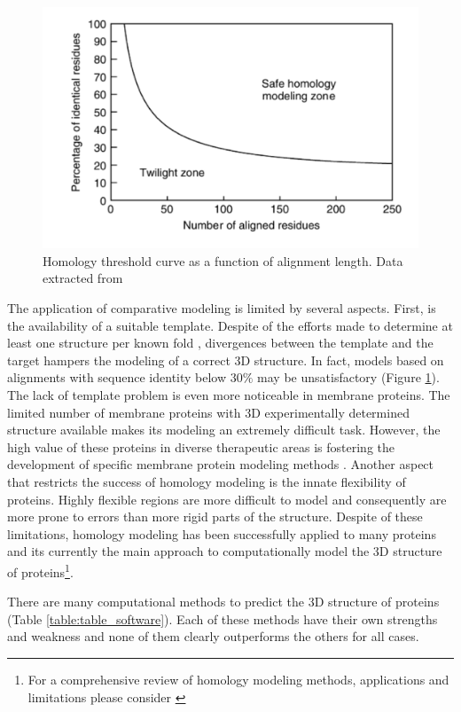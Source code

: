 \documentclass[11pt, b5paper,twoside]{tesi_upf}
\begin{document}
\begin{figure}[htbp]

  \centering
  	\includegraphics[scale=0.35]{../figures/homology_plot.pdf} %

	\caption[Homology threshold curve as a function of alignment length]{Homology threshold curve as a function of alignment length. Data extracted from \cite{Sander1991}}
	\label{fig:homology_modeling}
\end{figure}
\par The application of comparative modeling is limited by several aspects. First, is the availability of a suitable template. Despite of the efforts made to determine at least one structure per known fold \cite{Norvell2007}, divergences between the template and the target hampers the modeling of a correct 3D structure. In fact, models based on alignments with sequence identity below 30$\%$ may be unsatisfactory (Figure \ref{fig:homology_modeling}). The lack of template problem is even more noticeable in membrane proteins. The limited number of membrane proteins with 3D experimentally determined structure available makes its modeling an extremely difficult task. However, the high value of these proteins in diverse therapeutic areas \cite{Du2012, Kampen2011} is fostering the development of specific membrane protein modeling methods \cite{Leman2015}. Another aspect that restricts the success of homology modeling is the innate flexibility of proteins. Highly flexible regions are more difficult to model and consequently are more prone to errors than more rigid parts of the structure. Despite of these limitations, homology modeling has been successfully applied to many proteins and its currently the main approach to computationally model the 3D structure of proteins\footnote{For a comprehensive review of homology modeling methods, applications and limitations please consider \cite{Marti-Renom2000, Malmstrom2010}}. 
\par There are many computational methods to predict the 3D structure of proteins (Table \ref{table:table_software}). Each of these methods have their own strengths and weakness and none of them clearly outperforms the others for all cases.
 
\end{document}
